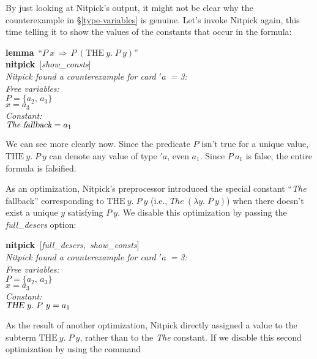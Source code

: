 \documentclass[a4paper,12pt]{article}
\begin{document}
By just looking at Nitpick's output, it might not be clear why the
counterexample in \S\ref{type-variables} is genuine. Let's invoke Nitpick again,
this time telling it to show the values of the constants that occur in the
formula:

\prew
\textbf{lemma}~``$P~x\,\Longrightarrow\, P~(\textrm{THE}~y.\;P~y)$'' \\
\textbf{nitpick}~[\textit{show\_consts}] \\[2\smallskipamount]
\slshape
Nitpick found a counterexample for \textit{card} $'a$~= 3: \\[2\smallskipamount]
\hbox{}\qquad Free variables: \nopagebreak \\
\hbox{}\qquad\qquad $P = \{a_2,\, a_3\}$ \\
\hbox{}\qquad\qquad $x = a_3$ \\
\hbox{}\qquad Constant: \nopagebreak \\
\hbox{}\qquad\qquad $\textit{The}~\textsl{fallback} = a_1$
\postw

We can see more clearly now. Since the predicate $P$ isn't true for a unique
value, $\textrm{THE}~y.\;P~y$ can denote any value of type $'a$, even
$a_1$. Since $P~a_1$ is false, the entire formula is falsified.

As an optimization, Nitpick's preprocessor introduced the special constant
``\textit{The} fallback'' corresponding to $\textrm{THE}~y.\;P~y$ (i.e.,
$\mathit{The}~(\lambda y.\;P~y)$) when there doesn't exist a unique $y$
satisfying $P~y$. We disable this optimization by passing the
\textit{full\_descrs} option:

\prew
\textbf{nitpick}~[\textit{full\_descrs},\, \textit{show\_consts}] \\[2\smallskipamount]
\slshape
Nitpick found a counterexample for \textit{card} $'a$~= 3: \\[2\smallskipamount]
\hbox{}\qquad Free variables: \nopagebreak \\
\hbox{}\qquad\qquad $P = \{a_2,\, a_3\}$ \\
\hbox{}\qquad\qquad $x = a_3$ \\
\hbox{}\qquad Constant: \nopagebreak \\
\hbox{}\qquad\qquad $\hbox{\slshape THE}~y.\;P~y = a_1$
\postw

As the result of another optimization, Nitpick directly assigned a value to the
subterm $\textrm{THE}~y.\;P~y$, rather than to the \textit{The} constant. If we
disable this second optimization by using the command
\end{document}
